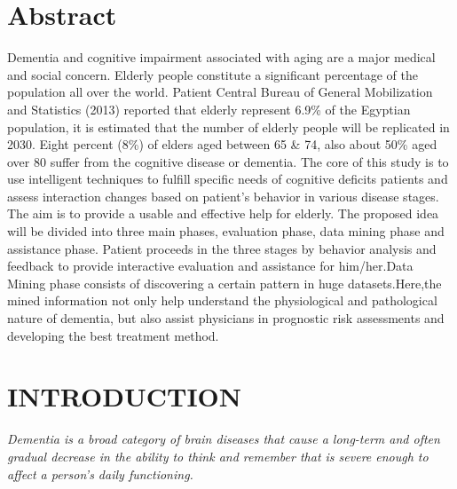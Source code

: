 \chapter*{Abstract}
Dementia and cognitive impairment associated with aging are a major medical and social concern. Elderly people constitute a significant percentage of the population all over the world. Patient Central Bureau of General Mobilization and Statistics (2013) reported that elderly represent 6.9\% of the Egyptian population, it is estimated that the number of elderly people will be replicated in 2030. Eight percent (8\%) of elders aged between 65 \& 74, also about 50\% aged over 80 suffer from the cognitive disease or dementia. The core of this study is to use intelligent techniques to fulfill specific needs of cognitive deficits patients and assess interaction changes based on patient’s behavior in various disease stages. The aim  is to provide a usable and effective help for elderly. The proposed idea will be divided into three main phases, evaluation phase, data mining phase and assistance phase. Patient proceeds in the three stages by behavior analysis and feedback to provide interactive evaluation and assistance for him/her.Data Mining phase consists of discovering a certain pattern in huge datasets.Here,the mined information not only help understand the physiological and pathological nature of dementia, but also assist physicians in prognostic risk assessments and developing the best treatment method.
\tableofcontents
{}
\listoffigures
{}
\listoftables
%
%
\chapter{INTRODUCTION}

{\em Dementia is a broad category of brain diseases that cause a long-term and often gradual decrease in the ability to think and remember that is severe enough to affect a person's daily functioning. }

